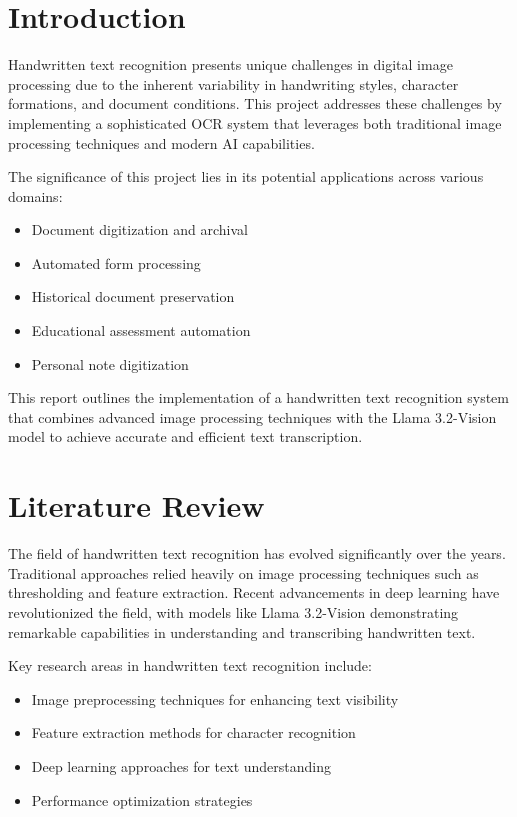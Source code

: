 \documentclass[a4paper,12pt]{article}
\begin{document}
\newpage

\tableofcontents
\newpage

\section{Introduction}
Handwritten text recognition presents unique challenges in digital image processing due to the inherent variability in handwriting styles, character formations, and document conditions. This project addresses these challenges by implementing a sophisticated OCR system that leverages both traditional image processing techniques and modern AI capabilities.

The significance of this project lies in its potential applications across various domains:
\begin{itemize}
    \item Document digitization and archival
    \item Automated form processing
    \item Historical document preservation
    \item Educational assessment automation
    \item Personal note digitization
\end{itemize}

This report outlines the implementation of a handwritten text recognition system that combines advanced image processing techniques with the Llama 3.2-Vision model to achieve accurate and efficient text transcription.

\section{Literature Review}
The field of handwritten text recognition has evolved significantly over the years. Traditional approaches relied heavily on image processing techniques such as thresholding and feature extraction. Recent advancements in deep learning have revolutionized the field, with models like Llama 3.2-Vision demonstrating remarkable capabilities in understanding and transcribing handwritten text.

Key research areas in handwritten text recognition include:
\begin{itemize}
    \item Image preprocessing techniques for enhancing text visibility
    \item Feature extraction methods for character recognition
    \item Deep learning approaches for text understanding
    \item Performance optimization strategies
\end{itemize}
\end{document}
